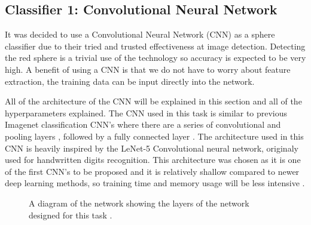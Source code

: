 \documentclass{article}
\begin{document}
\subsection{Classifier 1: Convolutional Neural Network}

It was decided to use a Convolutional Neural Network (CNN) as a sphere classifier due to their tried and trusted effectiveness at image detection.
Detecting the red sphere is a trivial use of the technology so accuracy is expected to be very high.
A benefit of using a CNN is that we do not have to worry about feature extraction, the training data can be input directly into the network.

All of the architecture of the CNN will be explained in this section and all of the hyperparameters explained.
The CNN used in this task is similar to previous Imagenet classification CNN's where there are a series of convolutional and pooling layers
, followed by a fully connected layer \cite{krizhevsky2012imagenet}. 
The architecture used in this CNN is heavily inspired by the LeNet-5 Convolutional neural network, originaly used for handwritten digits recognition.
This architecture was chosen as it is one of the first CNN's to be proposed and it is relatively shallow compared to newer deep learning methods, so training time and memory usage will be less intensive \cite{lecun1998gradient}. 

\begin{figure}[ht]
    \noindent{}
    \caption{A diagram of the network showing the layers of the network designed for this task \cite{LeNail2019}.}
    \label{fig:diagram}
\end{figure}
\end{document}
